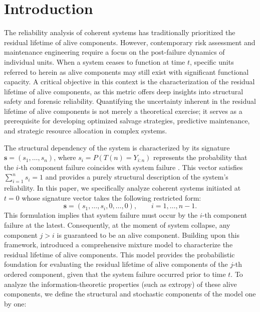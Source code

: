 \documentclass[twoside]{article}
\begin{document}
\section{Introduction}

The reliability analysis of coherent systems has traditionally prioritized the residual lifetime of alive components. However, contemporary risk assessment and maintenance engineering require a focus on the post-failure dynamics of individual units. When a system ceases to function at time $t$, specific units referred to herein as alive components may still exist with significant functional capacity. A critical objective in this context is the characterization of the residual lifetime of alive components, as this metric offers deep insights into structural safety and forensic reliability. Quantifying the uncertainty inherent in the residual lifetime of alive components is not merely a theoretical exercise; it serves as a prerequisite for developing optimized salvage strategies, predictive maintenance, and strategic resource allocation in complex systems.

The structural dependency of the system is characterized by its signature $\boldsymbol{s} = (s_1, \ldots, s_n)$, where $s_i = P(T(n) = Y_{i:n})$ represents the probability that the $i$-th component failure coincides with system failure \cite{Samaniego:2007}. This vector satisfies $\sum_{i=1}^{n} s_i = 1$ and provides a purely structural description of the system's reliability. In this paper, we specifically analyze coherent systems initiated at $t=0$ whose signature vector takes the following restricted form:
\begin{equation}
\boldsymbol s = (s_1, \ldots, s_i, 0, \ldots, 0), \qquad i = 1, \ldots, n-1.
\end{equation}
This formulation implies that system failure must occur by the $i$-th component failure at the latest. Consequently, at the moment of system collapse, any component $j > i$ is guaranteed to be an alive component. Building upon this framework, \cite{GoliforushaniAsadiBalakrishnan:2012} introduced a comprehensive mixture model to characterize the residual lifetime of alive components. This model provides the probabilistic foundation for evaluating the residual lifetime of alive components of the $j$-th ordered component, given that the system failure occurred prior to time $t$. To analyze the information-theoretic properties (such as extropy) of these alive components, we define the structural and stochastic components of the model one by one:
\end{document}
